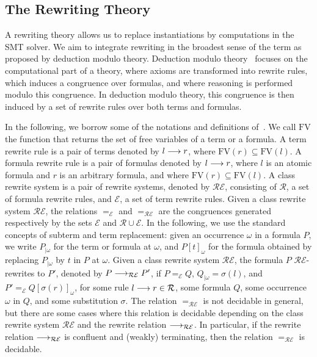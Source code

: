 \subsection{The Rewriting Theory}
\label{sec:rew}

A rewriting theory allows us to replace instantiations by
computations in the SMT solver. We aim to integrate rewriting in the broadest sense of the term as
proposed by deduction modulo theory. Deduction modulo theory~\cite{DA03} focuses
on the computational part of a theory, where axioms are transformed into rewrite
rules, which induces a congruence over formulas, and where reasoning is
performed modulo this congruence. In deduction modulo theory, this congruence is
then induced by a set of rewrite rules over both terms and formulas.

In the following, we borrow some of the notations and definitions
of~\cite{DA03}. We call $\mathrm{FV}$ the function that returns the set of
free variables of a term or a formula. A term rewrite rule is a pair of terms
denoted by $l\longrightarrow{}r$, where $\mathrm{FV}(r)\subseteq\mathrm{FV}(l)$. A
formula rewrite rule is a pair of formulas denoted by $l\longrightarrow{}r$, where
$l$ is an atomic formula and $r$ is an arbitrary formula, and where
$\mathrm{FV}(r)\subseteq\mathrm{FV}(l)$. A class rewrite system is a pair of
rewrite systems, denoted by $\mathcal{RE}$, consisting of $\mathcal{R}$, a set
of formula rewrite rules, and $\mathcal{E}$, a set of term rewrite rules.
Given a class rewrite system $\mathcal{RE}$, the relations $=_\mathcal{E}$ and
$=_\mathcal{RE}$ are the congruences generated respectively by the sets
$\mathcal{E}$ and $\mathcal{R}\cup\mathcal{E}$. In the following, we use the
standard concepts of subterm and term replacement: given an occurrence $\omega$
in a formula $P$, we write $P_{|\omega}$ for the term or formula at
$\omega$, and $P[t]_\omega$ for the formula obtained by replacing
$P_{|\omega}$ by $t$ in $P$ at $\omega$. Given a class rewrite system
$\mathcal{RE}$, the formula $P$ $\mathcal{RE}$-rewrites to $P'$, denoted by
$P\longrightarrow_\mathcal{RE}P'$, if $P=_\mathcal{E}Q$, $Q_{|\omega}=\sigma(l)$, and
$P'=_\mathcal{E}Q[\sigma(r)]_\omega$, for some rule $l\longrightarrow{}r\in\mathcal{R}$,
some formula $Q$, some occurrence $\omega$ in $Q$, and some substitution
$\sigma$. The relation $=_\mathcal{RE}$ is not decidable in general, but there are some
cases where this relation is decidable depending on the class rewrite system
$\mathcal{RE}$ and the rewrite relation $\longrightarrow_\mathcal{RE}$. In particular, if
the rewrite relation $\longrightarrow_\mathcal{RE}$ is confluent and (weakly) terminating,
then the relation $=_\mathcal{RE}$ is decidable.

